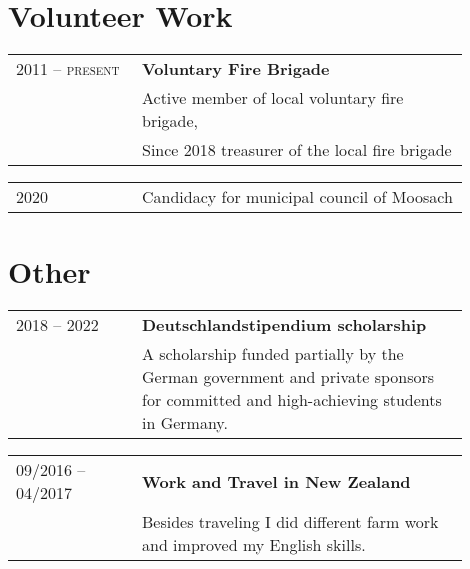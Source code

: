 \documentclass[a4paper, 10pt]{article}
\newenvironment{cventry}[2]
{   
    \setlength{\tabcolsep}{1.25em}
    \hypersetup{urlcolor=black}
    \begin{center}\hspace{-1.25cm}\begin{tabular}{p{0.25\linewidth}|p{0.65\linewidth}}
    \raggedleft\scshape #1 & \bfseries#2 \vspace{0.1cm}\\ & 
}
{\end{tabular}\end{center}}
\newenvironment{cventrynoheading}[1]
{
    \setlength{\tabcolsep}{1.25em}
    \begin{center}\hspace{-1.25cm}\begin{tabular}{p{0.25\linewidth}|p{0.65\linewidth}}
    \raggedleft\scshape #1 & 
}
{\end{tabular}\end{center}}
\newcommand{\newentryline}{\\&}
\begin{document}
\section{Volunteer Work}

\begin{cventry}{2011 -- present}{Voluntary Fire Brigade}
    Active member of local voluntary fire brigade, \newentryline 
    Since 2018 treasurer of the local fire brigade
\end{cventry}

\begin{cventrynoheading}{2020}
    Candidacy for municipal council of Moosach
\end{cventrynoheading}


\section{Other}

\begin{cventry}{2018 -- 2022} {Deutschlandstipendium scholarship}
    A scholarship funded partially by the German government and private sponsors for 
    committed and high-achieving students in Germany.
\end{cventry}

\begin{cventry}{09/2016 -- 04/2017}{Work and Travel in New Zealand}
    Besides traveling I did different farm work and improved my English skills.
\end{cventry}
\end{document}
